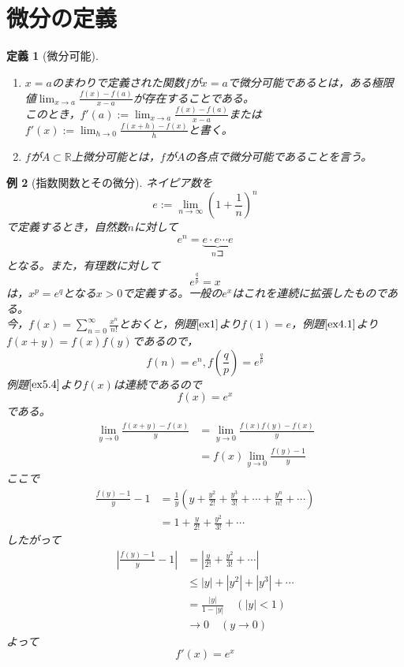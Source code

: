 \documentclass[dvipdfmx,a4j,10pt]{jsarticle}
\theoremstyle{mystyle1}
\newtheorem{dfn}{定義}[part]
\newtheorem{example}[dfn]{例}
\theoremstyle{mystyle2}
\begin{document}
\section{微分の定義}
\begin{framed}
    \begin{dfn}[微分可能]\label{def6.1}　
        \vspace{-\baselineskip}
        \begin{enumerate}
        \item $x=a$のまわりで定義された関数$f$が$x=a$で微分可能であるとは，ある極限値$\displaystyle \lim_{x\to a}\frac{f(x)-f(a)}{x-a}$が存在することである。\\
        このとき，$\displaystyle f'(a):=\lim_{x\to a}\frac{f(x)-f(a)}{x-a}$または$\displaystyle f'(x):=\lim_{h\to 0}\frac{f(x+h)-f(x)}{h}$と書く。
        \item $f$が$A\subset\mathbb{R}$上微分可能とは，$f$が$A$の各点で微分可能であることを言う。
        \end{enumerate}
    \end{dfn}
\end{framed}

\begin{example}[指数関数とその微分]
    ネイピア数を
    \[
    e:=\lim_{n\to\infty}\left(1+\frac{1}{n}\right)^n
    \]
    で定義するとき，自然数$n$に対して
    \[
    e^n=\underbrace{e\cdot e\cdots e}_{nコ}
    \]
    となる。また，有理数に対して
    \[
    e^{\frac{q}{p}}=x
    \]
    は，$x^p=e^q$となる$x>0$で定義する。一般の$e^x$はこれを連続に拡張したものである。\\
    今，$\displaystyle f(x)=\sum_{n=0}^{\infty}\frac{x^n}{n!}$とおくと，例題$\ref{ex1}$より$f(1)=e$，例題$\ref{ex4.1}$より$f(x+y)=f(x)f(y)$であるので，
    \[
    f(n)=e^n,f\left(\frac{q}{p}\right)=e^{\frac{q}{p}}
    \]
    例題$\ref{ex5.4}$より$f(x)$は連続であるので
    \[
    f(x)=e^x
    \]
    である。
    \[
    \begin{split}
    \lim_{y \to 0}\frac{f(x+y)-f(x)}{y}&=\lim_{y\to 0}\frac{f(x)f(y)-f(x)}{y}\\
    &=f(x)\lim_{y\to 0}\frac{f(y)-1}{y}
    \end{split}
    \]
    ここで
    \[
    \begin{split}
    \frac{f(y)-1}{y}-1&=\frac{1}{y}\left(y+\frac{y^2}{2!}+\frac{y^3}{3!}+\cdots +\frac{y^n}{n!}+\cdots\right)\\
    &=1+\frac{y}{2!}+\frac{y^2}{3!}+\cdots
    \end{split}
    \]
    したがって
    \[
    \begin{split}
    \left|\frac{f(y)-1}{y}-1\right|&=\left|\frac{y}{2!}+\frac{y^2}{3!}+\cdots\right|\\
    &\leq|y|+|y^2|+|y^3|+\cdots\\
    &=\frac{|y|}{1-|y|} \quad(|y|<1)\\
    &\to 0\quad(y\to 0)
    \end{split}
    \]
    よって
    \[
    f'(x)=e^x
    \]
\end{example}
\end{document}
